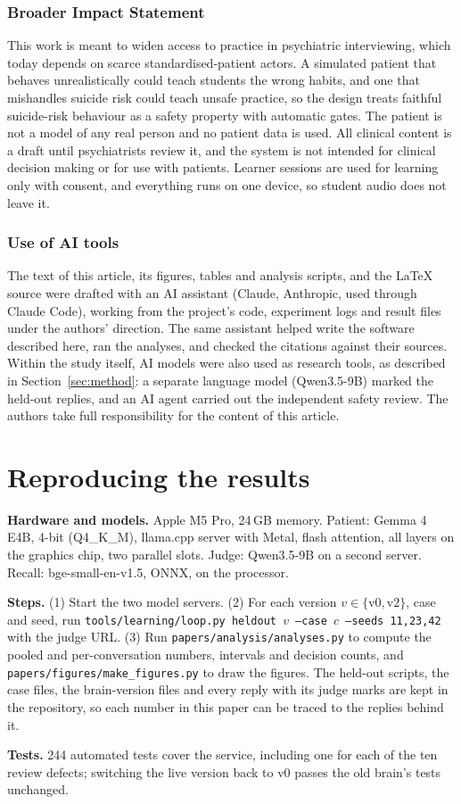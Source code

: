 \documentclass[10pt]{article}
\begin{document}
\subsubsection*{Broader Impact Statement}
This work is meant to widen access to practice in psychiatric interviewing, which today depends on scarce standardised-patient actors. A simulated patient that behaves unrealistically could teach students the wrong habits, and one that mishandles suicide risk could teach unsafe practice, so the design treats faithful suicide-risk behaviour as a safety property with automatic gates. The patient is not a model of any real person and no patient data is used. All clinical content is a draft until psychiatrists review it, and the system is not intended for clinical decision making or for use with patients. Learner sessions are used for learning only with consent, and everything runs on one device, so student audio does not leave it.

\subsubsection*{Use of AI tools}
The text of this article, its figures, tables and analysis scripts, and the \LaTeX{} source were
drafted with an AI assistant (Claude, Anthropic, used through Claude Code), working from the project's code, experiment logs and result
files under the authors' direction. The same assistant helped write the software described here, ran the analyses, and checked the
citations against their sources. Within the study itself, AI models were also used as research tools, as described in Section~\ref{sec:method}: a separate language model (Qwen3.5-9B) marked the held-out replies, and an AI agent carried out the independent safety review. The authors take full responsibility for the content of this article.



\appendix
\section{Reproducing the results}
\textbf{Hardware and models.} Apple M5 Pro, 24\,GB memory. Patient: Gemma 4 E4B, 4-bit (Q4\_K\_M), llama.cpp server with Metal, flash
attention, all layers on the graphics chip, two parallel slots. Judge: Qwen3.5-9B on a second server. Recall: bge-small-en-v1.5, ONNX, on the
processor.

\textbf{Steps.} (1) Start the two model servers. (2) For each version $v\in\{\text{v0},\text{v2}\}$, case and seed, run
\texttt{tools/learning/loop.py heldout $v$ --case $c$ --seeds 11,23,42} with the judge URL. (3) Run \texttt{papers/analysis/analyses.py} to
compute the pooled and per-conversation numbers, intervals and decision counts, and \texttt{papers/figures/make\_figures.py} to draw the
figures. The held-out scripts, the case files, the brain-version files and every reply with its judge marks are kept in the repository, so
each number in this paper can be traced to the replies behind it.

\textbf{Tests.} 244 automated tests cover the service, including one for each of the ten review defects; switching the live version back to v0
passes the old brain's tests unchanged.
\end{document}
